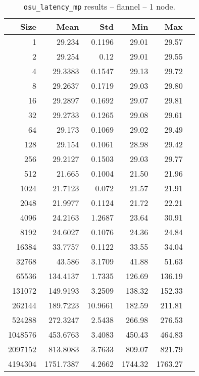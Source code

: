 
\begin{table}[htbp]
  \centering
  \begin{minipage}{.48\textwidth}
    \centering
    \footnotesize
  \begin{tabular}{rrrrrr}
	\toprule
	\textbf{Size} & \textbf{Mean} & \textbf{Std} & \textbf{Min} & \textbf{Max}	\\
	\midrule
	1	&	29.234   	&	0.1196	&	29.01	&	29.57	\\
	2	&	29.254   	&	0.12	&	29.01	&	29.55	\\
	4	&	29.3383   	&	0.1547	&	29.13	&	29.72	\\
	8	&	29.2637   	&	0.1719	&	29.03	&	29.80	\\
	16	&	29.2897   	&	0.1692	&	29.07	&	29.81	\\
	32	&	29.2733   	&	0.1265	&	29.08	&	29.61	\\
	64	&	29.173   	&	0.1069	&	29.02	&	29.49	\\
	128	&	29.154   	&	0.1061	&	28.98	&	29.42	\\
	256	&	29.2127   	&	0.1503	&	29.03	&	29.77	\\
	512	&	21.665   	&	0.1004	&	21.50	&	21.96	\\
	1024	&	21.7123   	&	0.072	&	21.57	&	21.91	\\
	2048	&	21.9977   	&	0.1124	&	21.72	&	22.21	\\
	4096	&	24.2163   	&	1.2687	&	23.64	&	30.91	\\
	8192	&	24.6027   	&	0.1076	&	24.36	&	24.84	\\
	16384	&	33.7757   	&	0.1122	&	33.55	&	34.04	\\
	32768	&	43.586   	&	3.1709	&	41.88	&	51.63	\\
	65536	&	134.4137   	&	1.7335	&	126.69	&	136.19	\\
	131072	&	149.9193   	&	3.2509	&	138.32	&	152.33	\\
	262144	&	189.7223   	&	10.9661	&	182.59	&	211.81	\\
	524288	&	272.3247   	&	2.5438	&	266.98	&	276.53	\\
	1048576	&	453.6763   	&	3.4083	&	450.43	&	464.83	\\
	2097152	&	813.8083   	&	3.7633	&	809.07	&	821.79	\\
	4194304	&	1751.7387   	&	4.2662	&	1744.32	&	1763.27	\\
	\bottomrule
	\end{tabular}
  \caption{\texttt{osu\_latency\_mp} results -- flannel -- 1 node.}

\end{minipage}
\end{table}
